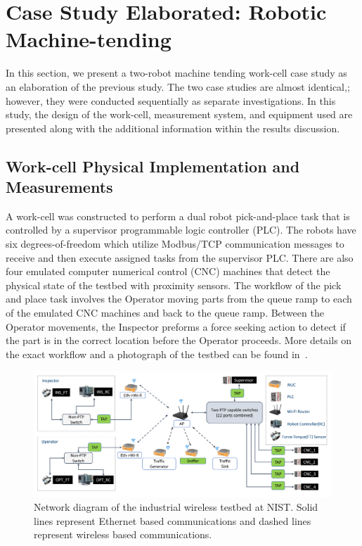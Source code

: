 \section{Case Study Elaborated: Robotic Machine-tending}
In this section, we present a two-robot machine tending work-cell case study as an elaboration of the previous study.  The two case studies are almost identical,; however, they were conducted sequentially as separate investigations.  In this study, the design of the work-cell, measurement system, and equipment used are presented along with the additional information within the results discussion. 

\subsection{Work-cell Physical Implementation and Measurements}

A work-cell was constructed to perform a dual robot pick-and-place task that is controlled by a supervisor programmable logic controller (PLC). The robots have six degrees-of-freedom which utilize Modbus/TCP communication messages to receive and then execute assigned tasks from the supervisor PLC. There are also four emulated computer numerical control (CNC) machines that detect the physical state of the testbed with proximity sensors. The workflow of the pick and place task involves the Operator moving parts from the queue ramp to each of the emulated CNC machines and back to the queue ramp. Between the Operator movements, the Inspector preforms a force seeking action to detect if the part is in the correct location before the Operator proceeds. More details on the exact workflow and a photograph of the testbed can be found in~\cite{Liu2019vancouver}. 

\begin{figure}
	\centering
	\includegraphics[width=\textwidth]{chapter-gdb-appl/figures/Fig1TiiSpecialDiagram-testbed2}
	\caption{Network diagram of the industrial wireless testbed at NIST. Solid lines represent Ethernet based communications and dashed lines represent wireless based communications.}
	\label{gdbappl:fig::database:netdiagram}
\end{figure}

